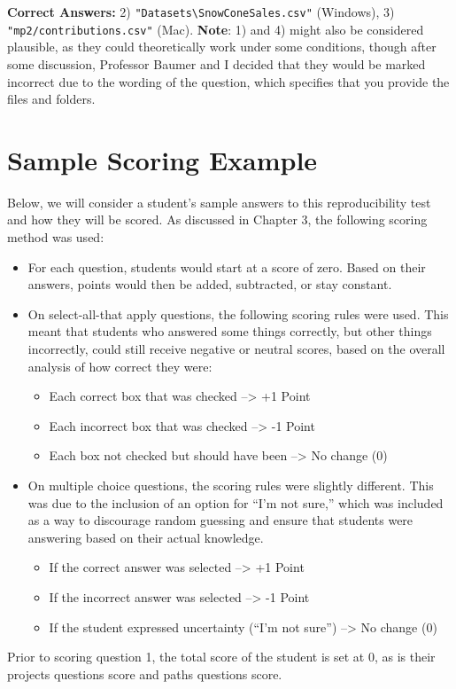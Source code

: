 \documentclass[12pt,twoside]{reedthesis}
\providecommand{\tightlist}{%
  \setlength{\itemsep}{0pt}\setlength{\parskip}{0pt}}
\begin{document}
\textbf{Correct Answers:} 2) \texttt{"Datasets\textbackslash{}SnowConeSales.csv"} (Windows), 3) \texttt{"mp2/contributions.csv"} (Mac). \textbf{Note}: 1) and 4) might also be considered plausible, as they could theoretically work under some conditions, though after some discussion, Professor Baumer and I decided that they would be marked incorrect due to the wording of the question, which specifies that you provide the files and folders.

\hypertarget{sample-scoring-example}{%
\section{Sample Scoring Example}\label{sample-scoring-example}}

Below, we will consider a student's sample answers to this reproducibility test and how they will be scored. As discussed in Chapter 3, the following scoring method was used:
\begin{itemize}
\item
  For each question, students would start at a score of zero. Based on their answers, points would then be added, subtracted, or stay constant.
\item
  On select-all-that apply questions, the following scoring rules were used. This meant that students who answered some things correctly, but other things incorrectly, could still receive negative or neutral scores, based on the overall analysis of how correct they were:
  \begin{itemize}
  \tightlist
  \item
    Each correct box that was checked --\textgreater{} +1 Point
  \item
    Each incorrect box that was checked --\textgreater{} -1 Point
  \item
    Each box not checked but should have been --\textgreater{} No change (0)
  \end{itemize}
\item
  On multiple choice questions, the scoring rules were slightly different. This was due to the inclusion of an option for ``I'm not sure,'' which was included as a way to discourage random guessing and ensure that students were answering based on their actual knowledge.
  \begin{itemize}
  \tightlist
  \item
    If the correct answer was selected --\textgreater{} +1 Point
  \item
    If the incorrect answer was selected --\textgreater{} -1 Point
  \item
    If the student expressed uncertainty (``I'm not sure'') --\textgreater{} No change (0)
  \end{itemize}
\end{itemize}
Prior to scoring question 1, the total score of the student is set at 0, as is their projects questions score and paths questions score.
\end{document}

